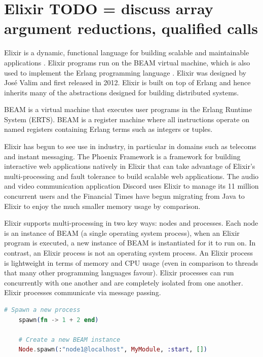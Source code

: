 \section{Elixir TODO = discuss array argument reductions, qualified calls}
Elixir is a dynamic, functional language for building scalable and maintainable applications \cite{elixir}. Elixir programs run on the BEAM virtual machine\cite{beam}, which is also used to implement the Erlang programming language \cite{erlang}. Elixir was designed by José Valim and first released in 2012. Elixir is built on top of Erlang and hence inherits many of the abstractions designed for building distributed systems.
\par
BEAM is a virtual machine that executes user programs in the Erlang Runtime System (ERTS). BEAM is a register machine where all instructions operate on named registers containing Erlang terms such as integers or tuples.
\par
Elixir has begun to see use in industry, in particular in domains such as telecoms and instant messaging. The Phoenix Framework \cite{phoenix} is a framework for building interactive web applications natively in Elixir that can take advantage of Elixir's multi-processing and fault tolerance to build scalable web applications. The audio and video communication application Discord \cite{discord} uses Elixir to manage its 11 million concurrent users and the Financial Times \cite{ft} have begun migrating from Java to Elixir to enjoy the much smaller memory usage by comparison.
\par
Elixir supports multi-processing in two key ways: nodes and processes. Each node is an instance of BEAM (a single operating system process), when an Elixir program is executed, a new instance of BEAM is instantiated for it to run on. In contrast, an Elixir process is not an operating system process. An Elixir process is lightweight in terms of memory and CPU usage (even in comparison to threads that many other programming languages favour). Elixir processes can run concurrently with one another and are completely isolated from one another. Elixir processes communicate via message passing.
\begin{lstlisting}[language=Elixir, xleftmargin=.2\linewidth, caption={An example of spawn/1 and spawn/4 in Elixir for spawning a new lightweight process and a new Elixir node}]
    # Spawn a new process
    spawn(fn -> 1 + 2 end)

    # Create a new BEAM instance
    Node.spawn(:"node1@localhost", MyModule, :start, [])
\end{lstlisting}
